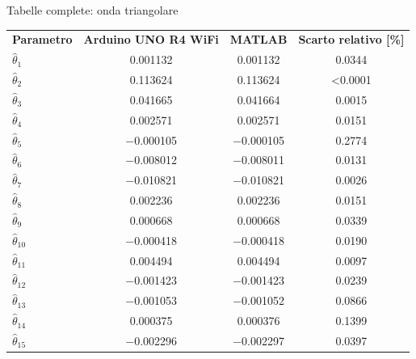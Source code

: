 \documentclass[aspectratio=169,9pt]{beamer}
\begin{document}
\begin{frame}{Tabelle complete: onda triangolare}
  \centering
  \par\vspace{1mm}
  \scriptsize
  \renewcommand{\arraystretch}{0.95}
  \begin{tabular}{@{}lccc@{}}
    \rowcolor{black!80}\color{white}\textbf{Parametro} & \color{white}\textbf{Arduino UNO R4 WiFi} &
      \color{white}\textbf{MATLAB} & \color{white}\textbf{Scarto relativo [\%]}\\
    $\hat\theta_1$ & 0.001132 & 0.001132 & 0.0344\\
    $\hat\theta_2$ & 0.113624 & 0.113624 & <0.0001\\
    $\hat\theta_3$ & 0.041665 & 0.041664 & 0.0015\\
    $\hat\theta_4$ & 0.002571 & 0.002571 & 0.0151\\
    $\hat\theta_5$ & −0.000105 & −0.000105 & 0.2774\\
    $\hat\theta_6$ & −0.008012 & −0.008011 & 0.0131\\
    $\hat\theta_7$ & −0.010821 & −0.010821 & 0.0026\\
    $\hat\theta_8$ & 0.002236 & 0.002236 & 0.0151\\
    $\hat\theta_9$ & 0.000668 & 0.000668 & 0.0339\\
    $\hat\theta_{10}$ & −0.000418 & −0.000418 & 0.0190\\
    $\hat\theta_{11}$ & 0.004494 & 0.004494 & 0.0097\\
    $\hat\theta_{12}$ & −0.001423 & −0.001423 & 0.0239\\
    $\hat\theta_{13}$ & −0.001053 & −0.001052 & 0.0866\\
    $\hat\theta_{14}$ & 0.000375 & 0.000376 & 0.1399\\
    $\hat\theta_{15}$ & −0.002296 & −0.002297 & 0.0397\\
  \end{tabular}
\end{frame}
\end{document}
